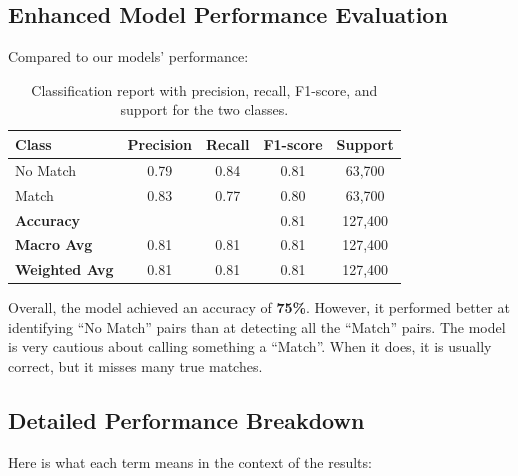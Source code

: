 \subsection{Enhanced Model Performance Evaluation}

Compared to our models' performance:

\begin{table}[H]
    \centering
    \renewcommand{\arraystretch}{1.2}
    \begin{tabular}{lcccc}
        \toprule
        \textbf{Class}        & \textbf{Precision} & \textbf{Recall} & \textbf{F1-score} & \textbf{Support} \\
        \midrule
        No Match              & 0.79               & 0.84            & 0.81              & 63,700           \\
        Match                 & 0.83               & 0.77            & 0.80              & 63,700           \\
        \midrule
        \textbf{Accuracy}     &                    &                 & 0.81              & 127,400          \\
        \textbf{Macro Avg}    & 0.81               & 0.81            & 0.81              & 127,400          \\
        \textbf{Weighted Avg} & 0.81               & 0.81            & 0.81              & 127,400          \\
        \bottomrule
    \end{tabular}
    \caption{Classification report with precision, recall, F1-score, and support for the two classes.}
    \label{tab:classification_report2}
\end{table}

Overall, the model achieved an accuracy of \textbf{75\%}. However, it performed better at identifying ``No Match'' pairs than at detecting all the ``Match'' pairs. The model is very cautious about calling something a ``Match''. When it does, it is usually correct, but it misses many true matches.

\subsection{Detailed Performance Breakdown}

Here is what each term means in the context of the results:

